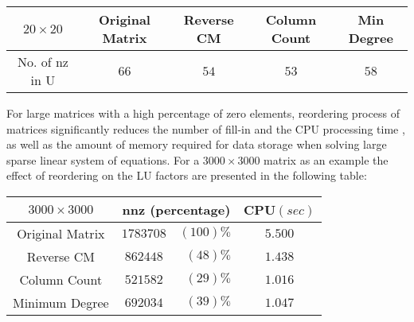 \vskip 10pt
\noindent
\begin{center}
    \begin{tabular}{c|cccc}
        $20 \times 20$ & Original Matrix & Reverse CM & Column Count & Min Degree  \\ \hline
        No. of nz in U &$ 66 $           & $ 54 $      & $ 53 $        &$ 58 $  \\
    \end{tabular}
\end{center}
\vskip 10pt
\noindent

For large matrices with a high percentage of zero elements, reordering process
of matrices significantly reduces the number of fill-in and the CPU processing
time , as well as the amount of memory required for data storage when solving
large sparse linear system of equations.
\vskip 10pt
\noindent
For a $3000\times 3000$ matrix as an example the effect of reordering on the LU
factors are presented in the following table:

\vskip 10pt
\noindent
\begin{center}
  \begin{tabular}{c|cr|c}
    $3000 \times 3000$ & \multicolumn{2}{c|}{nnz (percentage)} &  CPU$(sec)$ \\ \hline
    Original Matrix    &$ 1783708$ &$(100)\%$& $5.500$ \\
    Reverse CM         &$ 862448$  &$(48)\% $& $1.438$ \\
    Column Count       &$ 521582$  &$(29)\% $& $1.016$ \\
    Minimum Degree     &$ 692034$  &$(39)\% $& $1.047$ \\
  \end{tabular}
\end{center}
\vskip 5pt
\noindent

